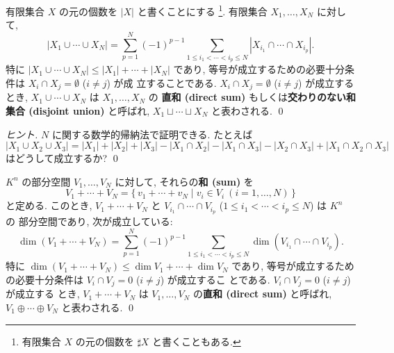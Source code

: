 \documentclass[12pt,twoside]{jarticle}
\begin{document}

\begin{question}[有限集合の和と直和]
  \label{q:num(union-Xi)}
  有限集合 $X$ の元の個数を $|X|$ と書くことにする%
  \footnote{有限集合 $X$ の元の個数を $\sharp X$ と書くこともある.}.
  有限集合 $X_1,\ldots,X_N$ に対して,
  \begin{equation*}
    |X_1\cup\cdots\cup X_N|
    = \sum_{p=1}^N (-1)^{p-1}
    \sum_{1\le i_1<\cdots<i_p\le N}
    |X_{i_1}\cap\cdots\cap X_{i_p}|.
  \end{equation*}
  特に $|X_1\cup\cdots\cup X_N|\le |X_1|+\cdots+|X_N|$ であり,
  等号が成立するための必要十分条件は $X_i\cap X_j=\emptyset$ ($i\ne j$) が成
  立することである. 
  $X_i\cap X_j=\emptyset$ ($i\ne j$) が成立する
  とき, $X_1\cup\cdots\cup X_N$ は $X_1,\ldots,X_N$ の
  {\bf 直和 (direct sum)} もしくは{\bf 交わりのない和集合 (disjoint union)} 
  と呼ばれ, $X_1\sqcup\cdots\sqcup X_N$ と表わされる.
  \qed
\end{question}

\begin{proof}[ヒント]
  $N$ に関する数学的帰納法で証明できる. たとえば
  {\small
  \begin{equation*}
    |X_1\cup X_2\cup X_3|
    = |X_1| + |X_2| + |X_3| 
    - |X_1\cap X_2| - |X_1\cap X_3| - |X_2\cap X_3|
    + |X_1\cap X_2\cap X_3|
  \end{equation*}
  }はどうして成立するか? \qed
\end{proof}

\begin{question}[線形部分空間の和と直和]
  \label{q:dim(sum-Vi)}
  $K^n$ の部分空間 $V_1,\ldots,V_N$ に対して, それらの{\bf 和 (sum)} を
  \begin{equation*}
    V_1+\cdots+V_N
    = \{\, v_1+\cdots+v_N \mid v_i\in V_i \ (i=1,\ldots,N)\,\}
  \end{equation*}
  と定める. このとき, $V_1+\cdots+V_N$ 
  と $V_{i_1}\cap\cdots\cap V_{i_p}$ ($1\le i_1<\cdots<i_p\le N$) は $K^n$ の
  部分空間であり, 次が成立している:
  \begin{equation*}
    \dim(V_1+\cdots+V_N)
    = \sum_{p=1}^N (-1)^{p-1}
    \sum_{1\le i_1<\cdots<i_p\le N}
    \dim(V_{i_1}\cap\cdots\cap V_{i_p}).
  \end{equation*}
  特に $\dim(V_1+\cdots+V_N)\le\dim V_1+\cdots+\dim V_N$ であり,
  等号が成立するための必要十分条件は $V_i\cap V_j=0$ ($i\ne j$) が成立するこ
  とである. 
  $V_i\cap V_j=0$ ($i\ne j$) が成立する
  とき, $V_1+\cdots+V_N$ は $V_1,\ldots,V_N$ の{\bf 直和 (direct sum)}
  と呼ばれ, $V_1\oplus\cdots\oplus V_N$ と表わされる.
  \qed
\end{question}
\end{document}
